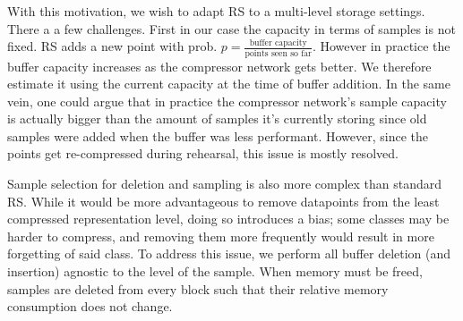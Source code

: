\documentclass[colorinlistoftodos]{article} %
\begin{document}
With this motivation, we wish to adapt RS to a multi-level storage settings. There a a few challenges. First in our case the capacity in terms of samples is not fixed. RS adds a new point with prob. $p=\frac{\text{buffer capacity}}{\text{points seen so far}}$. However in practice the buffer capacity increases as the compressor network gets better. We therefore estimate it using the current capacity at the time of buffer addition. In the same vein, one could argue that in practice the compressor network's sample capacity is actually bigger than the amount of samples it's currently storing since old samples were added when the buffer was less performant. However, since the points get re-compressed during rehearsal, this issue is mostly resolved.

Sample selection for deletion and sampling is also more complex than standard RS. While it would be more advantageous to remove datapoints from the least compressed representation level, doing so introduces a bias; some classes may be harder to compress, and removing them more frequently would result in more forgetting of said class. To address this issue, we perform all buffer deletion (and insertion) agnostic to the level of the sample. When memory must be freed, samples are deleted from every block such that their relative memory consumption does not change.
    









\end{document}
